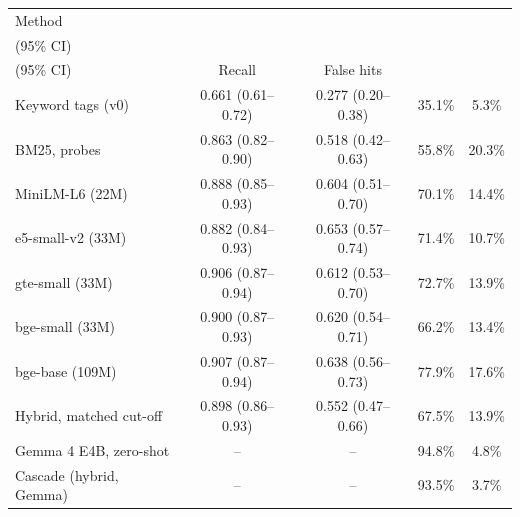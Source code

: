\begin{tabular*}{\textwidth}{@{\extracolsep{\fill}}lcccc@{}}
\toprule
Method & \begin{tabular}{@{}c@{}}Risk AUROC\\(95\% CI)\end{tabular} & \begin{tabular}{@{}c@{}}Risk AUPRC\\(95\% CI)\end{tabular} & Recall & False hits\\
\midrule
Keyword tags (v0) & 0.661 (0.61--0.72) & 0.277 (0.20--0.38) & 35.1\% & 5.3\%\\
BM25, probes & 0.863 (0.82--0.90) & 0.518 (0.42--0.63) & 55.8\% & 20.3\%\\
MiniLM-L6 (22M) & 0.888 (0.85--0.93) & 0.604 (0.51--0.70) & 70.1\% & 14.4\%\\
e5-small-v2 (33M) & 0.882 (0.84--0.93) & 0.653 (0.57--0.74) & 71.4\% & 10.7\%\\
gte-small (33M) & 0.906 (0.87--0.94) & 0.612 (0.53--0.70) & 72.7\% & 13.9\%\\
bge-small (33M) & 0.900 (0.87--0.93) & 0.620 (0.54--0.71) & 66.2\% & 13.4\%\\
bge-base (109M) & 0.907 (0.87--0.94) & 0.638 (0.56--0.73) & 77.9\% & 17.6\%\\
Hybrid, matched cut-off & 0.898 (0.86--0.93) & 0.552 (0.47--0.66) & 67.5\% & 13.9\%\\
\midrule
Gemma 4 E4B, zero-shot & -- & -- & 94.8\% & 4.8\%\\
Cascade (hybrid, Gemma) & -- & -- & 93.5\% & 3.7\%\\
\bottomrule
\end{tabular*}
